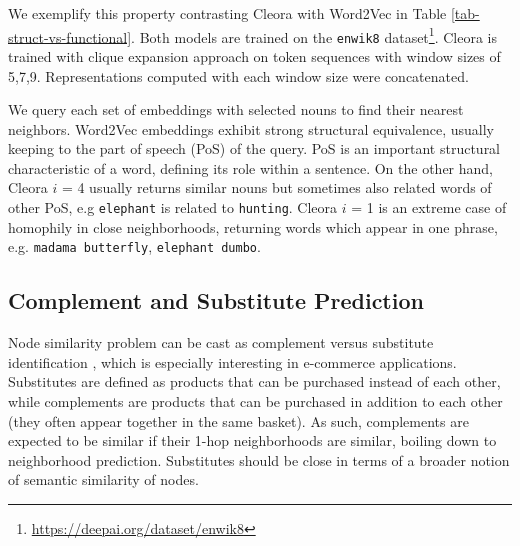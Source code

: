 \documentclass{IEEEtran}
\begin{document}
We exemplify this property contrasting Cleora with Word2Vec \cite{Word2Vec} in Table \ref{tab-struct-vs-functional}. Both models are trained on the \texttt{enwik8} dataset\footnote{\url{https://deepai.org/dataset/enwik8}}. Cleora is trained with clique expansion approach on token sequences with window sizes of 5,7,9. Representations computed with each window size were concatenated. 

We query each set of embeddings with selected nouns to find their nearest neighbors. Word2Vec embeddings exhibit strong structural equivalence, usually keeping to the part of speech (PoS) of the query. PoS is an important structural characteristic of a word, defining its role within a sentence. On the other hand, Cleora $i$ = 4 usually returns similar nouns but sometimes also related words of other PoS, e.g \texttt{elephant} is related to \texttt{hunting}. Cleora $i$ = 1 is an extreme case of homophily in close neighborhoods, returning words which appear in one phrase, e.g. \texttt{madama butterfly}, \texttt{elephant dumbo}.

       




\subsection{Complement and Substitute Prediction}
Node similarity problem can be cast as complement versus substitute identification \cite{mcauley2015inferring}, which is especially interesting in e-commerce applications. Substitutes are defined as products that can be purchased instead of each other, while complements are products that can be purchased in addition to each other (they often appear together in the same basket). As such, complements are expected to be similar if their 1-hop neighborhoods are similar, boiling down to neighborhood prediction. Substitutes should be close in terms of a broader notion of semantic similarity of nodes.
\end{document}
